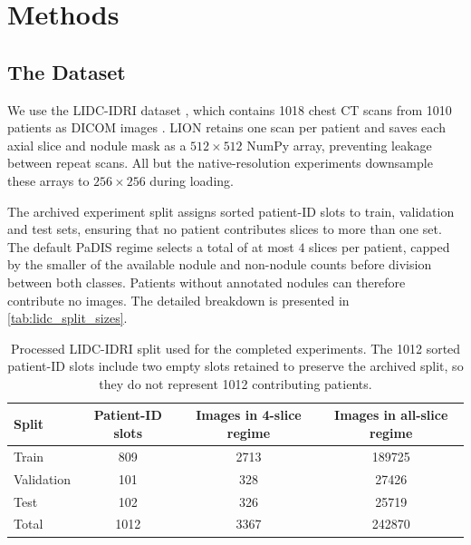 \ifpdf
    \graphicspath{{Sections/3_methods_figs/Raster/}{Sections/3_methods_figs/PDF/}{Sections/3_methods_figs/}}
\else
    \graphicspath{{Sections/3_methods_figs/Vector/}{Sections/3_methods_figs/}}
\fi

\chapter{Methods}
\label{sec:method}

\section{The Dataset}
We use the LIDC-IDRI dataset \cite{lidc}, which contains 1018 chest CT scans from 1010 patients as DICOM images \cite{DICOM}. LION retains one scan per patient and saves each axial slice and nodule mask as a $512\times512$ NumPy array, preventing leakage between repeat scans. All but the native-resolution experiments downsample these arrays to $256\times256$ during loading.

The archived experiment split assigns sorted patient-ID slots to train, validation and test sets, ensuring that no patient contributes slices to more than one set. The default PaDIS regime selects a total of at most $4$ slices per patient, capped by the smaller of the available nodule and non-nodule counts before division between both classes. Patients without annotated nodules can therefore contribute no images. The detailed breakdown is presented in \autoref{tab:lidc_split_sizes}.

\begin{table}[ht] 
    \centering 
    \begin{tabular}{lccc} 
        \hline \textbf{Split} & \textbf{Patient-ID slots} & \textbf{Images in 4-slice regime} & \textbf{Images in all-slice regime} \\
        \hline 
        Train & 809 & 2713 & 189725 \\ 
        Validation & 101 & 328 & 27426 \\ 
        Test & 102 & 326 & 25719 \\ 
        \hline Total & 1012 & 3367 & 242870 \\ 
        \hline 
    \end{tabular}
    \caption[Processed LIDC-IDRI split sizes.]{Processed LIDC-IDRI split used for the completed experiments. The 1012 sorted patient-ID slots include two empty slots retained to preserve the archived split, so they do not represent 1012 contributing patients.}
    \label{tab:lidc_split_sizes} 
\end{table}

